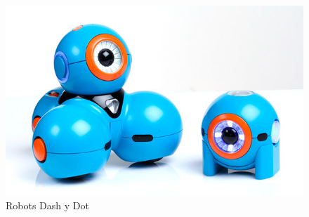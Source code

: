    \begin{figure}
	\centering
	\includegraphics[width=0.6\linewidth]{imagenes/dashanddot.jpg}
	\caption{Robots Dash y Dot}
	\label{fig:dashanddot}
\end{figure} 
 
   
 

 

   
